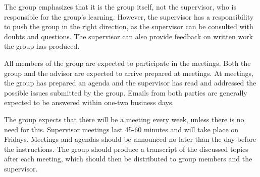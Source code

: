 \documentclass[../ProjectFoundation.tex]{subfiles}
\begin{document}
The group emphasizes that it is the group itself, not the supervisor, who is responsible for the group's learning. However, the supervisor has a responsibility to push the group in the right direction, as the supervisor can be consulted with doubts and questions. The supervisor can also provide feedback on written work the group has produced.

All members of the group are expected to participate in the meetings. Both the group and the advisor are expected to arrive prepared at meetings. At meetings, the group has prepared an agenda and the supervisor has read and addressed the possible issues submitted by the group.
Emails from both parties are generally expected to be answered within one-two business days.

The group expects that there will be a meeting every week, unless there is no need for this. Supervisor meetings last 45-60 minutes and will take place on Fridays. Meetings and agendas should be announced no later than the day before the instructions. The group should produce a transcript of the discussed topics after each meeting, which should then be distributed to group members and the supervisor.
\end{document}
